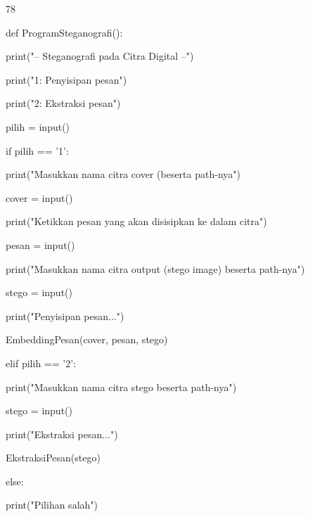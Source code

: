 \documentclass{article}
\begin{document}

78

def ProgramSteganografi():    

   print("-- Steganografi pada Citra Digital --")  

   print("1: Penyisipan pesan")   

   print("2: Ekstraksi pesan")   

   pilih = input()    

   if pilih == '1':       

      print("Masukkan nama citra cover (beserta path-nya")       

      cover = input()        

      print("Ketikkan pesan yang akan disisipkan ke dalam citra")       

      pesan = input()       

      print("Masukkan nama citra output (stego image) beserta path-nya")

      stego = input()      

      print("Penyisipan pesan...")       

      EmbeddingPesan(cover, pesan, stego)   

    elif pilih == '2':        

      print("Masukkan nama citra stego beserta path-nya")        

      stego = input()        

      print("Ekstraksi pesan...")        

      EkstraksiPesan(stego)   

    else:       

      print("Pilihan salah")
\end{document}
